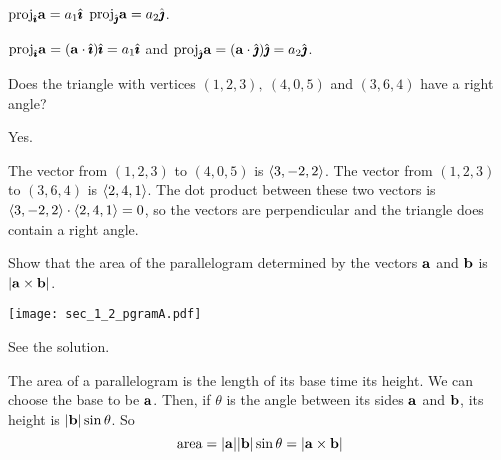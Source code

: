
\begin{answer}
$\text{proj}_{\hat{\pmb{\imath}}}\mathbf{a}=a_1\hat{\pmb{\imath}}$\qquad
$\text{proj}_{\hat{\pmb{\jmath}}}\mathbf{a}=a_2\hat{\pmb{\jmath}}$.
\end{answer}

\begin{solution}
$\text{proj}_{\hat{\pmb{\imath}}}\mathbf{a}=(\mathbf{a}\cdot\hat{\pmb{\imath}})\hat{\pmb{\imath}}
=a_1\hat{\pmb{\imath}}$ and
$\text{proj}_{\hat{\pmb{\jmath}}}\mathbf{a}=(\mathbf{a}\cdot\hat{\pmb{\jmath}})\hat{\pmb{\jmath}}
=a_2\hat{\pmb{\jmath}}$.
\end{solution}

\begin{question}
Does the triangle with vertices $(1,2,3),\ (4,0,5)$ and $(3,6,4)$
have a right angle?
\end{question}


\begin{answer}
Yes.
\end{answer}

\begin{solution}
The vector from $(1,2,3)$ to $(4,0,5)$ is $\left< 3,-2,2\right>$.
The vector from $(1,2,3)$ to $(3,6,4)$ is $\left< 2,4,1\right>$.
The dot product between these two vectors is 
$\left< 3,-2,2\right>\cdot\left< 2,4,1\right>=0$,
so the vectors are perpendicular and the triangle does contain a right
angle.

\end{solution}

\begin{question}
Show that the area of the parallelogram determined by the
vectors $\mathbf{a}$ and $\mathbf{b}$ is $|\mathbf{a}\times \mathbf{b}|$.

\begin{center}
     \texttt{[image: sec\_1\_2\_pgramA.pdf]}
\end{center}

\end{question}


\begin{answer}
See the solution.
\end{answer}

\begin{solution}
 The area of a parallelogram is the length of its
base time its height. 
%
We can choose the base to be $\mathbf{a}$. Then, if $\theta$
is the angle between its sides $\mathbf{a}$ and $\mathbf{b}$, its height is 
$|\mathbf{b}|\sin\theta$.  
So
\begin{equation*}
\text{area} = |\mathbf{a}||\mathbf{b}|\sin\theta=|\mathbf{a}\times\mathbf{b}|
\end{equation*}
\end{solution}

